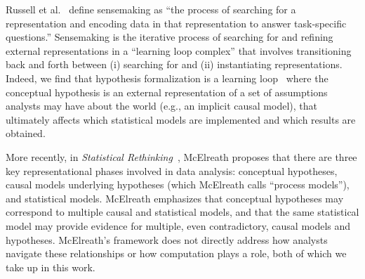 Russell et al.~\cite{russell1993cost} define sensemaking as ``the process of
searching for a representation and encoding data in that representation to
answer task-specific questions.'' Sensemaking is the iterative process of
searching for and refining external representations in a ``learning loop
complex'' that involves transitioning back and forth between (i) searching for
and (ii) instantiating representations.
Indeed, we find that hypothesis formalization is a learning
loop~\cite{russell1993cost} where the conceptual hypothesis is an external
representation of a set of assumptions analysts may have about the world (e.g.,
an implicit causal model), that ultimately affects which statistical models are
implemented and which results are obtained. 

More recently, in \textit{Statistical
Rethinking}~\cite{mcelreath2020statistical}, McElreath proposes that there are
three key representational phases involved in data analysis: conceptual
hypotheses, causal models underlying hypotheses (which McElreath calls ``process
models''), and statistical models. McElreath emphasizes that conceptual
hypotheses may correspond to multiple causal and statistical models, and that
the same statistical model may provide evidence for multiple, even
contradictory, causal models and hypotheses. McElreath's framework does not
directly address how analysts navigate these relationships or how computation
plays a role, both of which we take up in this work. 



